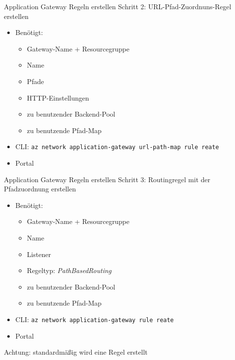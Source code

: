 \begin{flashcard}[Definition]{Application Gateway Regeln erstellen}
    Schritt 2: URL-Pfad-Zuordnuns-Regel erstellen
    \begin{itemize}
        \item Benötigt:
            \begin{itemize}
                \item Gateway-Name + Resourcegruppe
                \item Name
                \item Pfade
                \item HTTP-Einstellungen
                \item zu benutzender Backend-Pool
                \item zu benutzende Pfad-Map
            \end{itemize}
        \item CLI: \texttt{az network application-gateway url-path-map rule reate}
        \item Portal
    \end{itemize}
\end{flashcard}

\begin{flashcard}[Definition]{Application Gateway Regeln erstellen}
    Schritt 3: Routingregel mit der Pfadzuordnung erstellen
    \begin{itemize}
        \item Benötigt:
            \begin{itemize}
                \item Gateway-Name + Resourcegruppe
                \item Name
                \item Listener
                \item Regeltyp: \emph{PathBasedRouting}
                \item zu benutzender Backend-Pool
                \item zu benutzende Pfad-Map
            \end{itemize}
        \item CLI: \texttt{az network application-gateway rule reate}
        \item Portal
    \end{itemize}
    Achtung: standardmäßig wird eine Regel erstellt
\end{flashcard}

